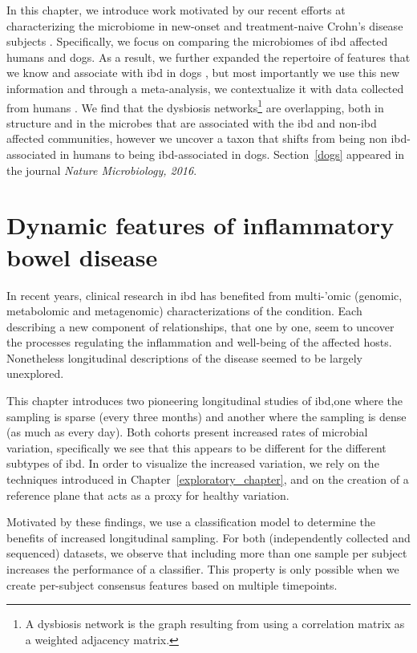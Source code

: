 \documentclass[12pt,chapterheads]{ucsd}
\begin{document}
In this chapter, we introduce work motivated by our recent efforts at 
characterizing the microbiome in new-onset and treatment-naive Crohn's disease 
subjects \cite{RN154}. Specifically, we focus on comparing the microbiomes of 
\gls{ibd} affected humans and dogs. As a result, we further expanded the 
repertoire of features that we know and associate with \gls{ibd} in dogs 
\cite{RN153}, but most importantly we use this new information and through a 
meta-analysis, we contextualize it with data collected from humans 
\cite{RN154}.  We find that the dysbiosis networks\footnote{A dysbiosis network 
is the graph resulting from using a correlation matrix as a weighted adjacency 
matrix.} are overlapping, both in structure and in the microbes that are 
associated with the \gls{ibd} and non-\gls{ibd} affected communities, however 
we uncover a taxon that shifts from being non \gls{ibd}-associated in humans to 
being \gls{ibd}-associated in dogs.  Section~\ref{dogs} appeared in the journal 
\textsl{Nature Microbiology, 2016}.

\ifdefined\RELEASE
    
\fi

\chapter{Dynamic features of inflammatory bowel disease}\label{chapter_ibds}

In recent years, clinical research in \gls{ibd} has benefited from multi-'omic 
(genomic\cite{RN4217}, metabolomic\cite{RN4264} and metagenomic\cite{RN4263}) 
characterizations of the condition. Each describing a new component of 
relationships, that one by one, seem to uncover the processes regulating the 
inflammation and well-being of the affected hosts. Nonetheless longitudinal 
descriptions of the disease seemed to be largely unexplored.

This chapter introduces two pioneering longitudinal studies of \gls{ibd},one 
where the sampling is sparse (every three months) and another where the 
sampling is dense (as much as every day). Both cohorts present increased rates 
of microbial variation, specifically we see that this appears to be different 
for the different subtypes of \gls{ibd}. In order to visualize the increased 
variation, we rely on the techniques introduced in 
Chapter~\ref{exploratory_chapter}, and on the creation of a reference plane 
that acts as a proxy for healthy variation.

Motivated by these findings, we use a classification model to determine the 
benefits of increased longitudinal sampling. For both (independently collected 
and sequenced) datasets, we observe that including more than one sample per 
subject increases the performance of a classifier. This property is only 
possible when we create per-subject consensus features based on multiple 
timepoints.
\end{document}
